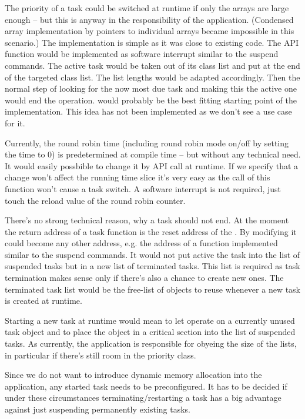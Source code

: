 The priority of a task could be switched at runtime if only the arrays are
large enough -- but this is anyway in the responsibility of the
application. (Condensed array implementation by pointers to individual
arrays became impossible in this scenario.) The implementation is simple
as it was close to existing code. The API function would be implemented as
software interrupt similar to the suspend commands. The active task would
be taken out of its class list and put at the end of the targeted class
list. The list lengths would be adapted accordingly. Then the normal step
of looking for the now most due task and making this the active one would
end the operation.  would probably be the best fitting
starting point of the implementation. This idea has not been implemented
as we don't see a use case for it.

Currently, the round robin time (including round robin mode on/off by
setting the time to 0) is predetermined at compile time -- but without any
technical need. It would easily possbible to change it by API call at
runtime. If we specify that a change won't affect the running time slice
it's very easy as the call of this function won't cause a task switch. A
software interrupt is not required, just touch the reload value of the
round robin counter.

There's no strong technical reason, why a task should not end. At the
moment the return address of a task function is the reset address of the
\uC{}. By modifying  it could become any other
address, e.g. the address of a function implemented similar to the suspend
commands. It would not put active the task into the list of suspended
tasks but in a new list of terminated tasks. This list is required as task
termination makes sense only if there's also a chance to create new ones.
The terminated task list would be the free-list of objects to reuse
whenever a new task is created at runtime.

Starting a new task at runtime would mean to let 
operate on a currently unused task object and to place the object in a
critical section into the list of suspended tasks. As currently, the
application is responsible for obyeing the size of the lists, in
particular if there's still room in the priority class.

Since we do not want to introduce dynamic memory allocation into the
application, any started task needs to be preconfigured. It has to be
decided if under these circumstances terminating/restarting a task has a
big advantage against just suspending permanently existing tasks.


